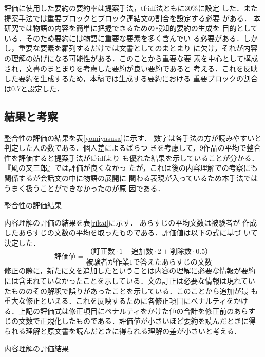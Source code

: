 \documentclass[japanese]{jnlp_1.4}
\begin{document}
 評価に使用した要約の要約率は提案手法，tf$\cdot$idf法ともに30\%に設定
 した．また提案手法では重要ブロックとブロック連結文の割合を設定する必要
 がある．
 本研究では物語の内容を簡単に把握できるための報知的要約の生成を
 目的としている．そのため要約には物語に重要な要素を多く含んでい
 る必要がある．しかし，重要な要素を羅列するだけでは文書としてのまとまり
 に欠け，それが内容の理解の妨げになる可能性がある．このことから重要な要
 素を中心として構成され，文書のまとまりを考慮した要約が良い要約であると
 考える．これを反映した要約を生成するため，本稿では生成する要約における
 重要ブロックの割合は0.7と設定した．
 
 
 \subsection{結果と考察}\label{result}

 整合性の評価の結果を表\ref{yomiyasusa}に示す．
  数字は各手法の方が読みやすいと判定した人の数である．個人差によるばらつ
 きを考慮して，9作品の平均で整合性を評価すると提案手法がtf$\cdot$idfより
 も優れた結果を示していることが分かる．
 『風の又三郎』では評価が良くなかっ
 たが，これは後の内容理解での考察にも関係するが会話文の中に物語の展開に
 関わる表現が入っているため本手法ではうまく扱うことができなかったのが原
 因である．

 \begin{table}[b]
   \caption{整合性の評価結果}\label{yomiyasusa}
  \begin{center}

  \end{center}
 \end{table}
 

 内容理解の評価の結果を表\ref{rikai}に示す．
あらすじの平均文数は被験者が
 作成したあらすじの文数の平均を取ったものである．評価値は以下の式に基づ
 いて決定した．
 \[
  評価値=\frac{（訂正数 \cdot 1+追加数 \cdot 2+削除数 \cdot 0.5）}{被験者が作業1で答えたあらすじの
  文数}
 \]
 修正の際に，新たに文を追加したということは内容の理解に必要な情報が要約
 には含まれていなかったことを示している．文の訂正は必要な情報は現れてい
 たもののその解釈で誤りがあったことを示している．このことから追加が最
 も重大な修正といえる．これを反映するために各修正項目にペナルティをかけ
 る．上記の評価式は修正項目にペナルティをかけた値の合計を修正前のあらす
 じの文数で正規化したものである．評価値が小さいほど要約を読んだときに得
 られる理解と原文書を読んだときに得られる理解の差が小さいと考える．

 \begin{table}[b]
   \caption{内容理解の評価結果}\label{rikai}
  \begin{center}

  \end{center}
 \end{table}
\end{document}
